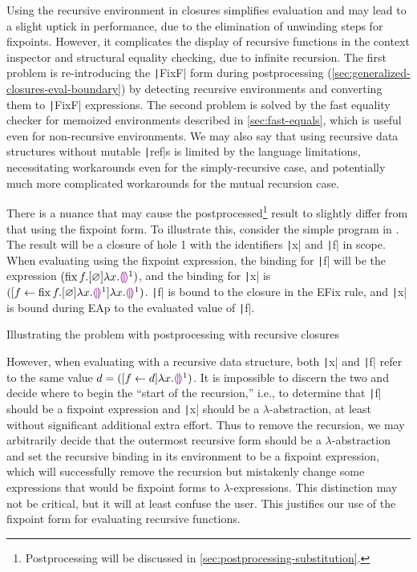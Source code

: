Using the recursive environment in closures simplifies evaluation and may lead to a slight uptick in performance, due to the elimination of unwinding steps for fixpoints. However, it complicates the display of recursive functions in the context inspector and structural equality checking, due to infinite recursion. The first problem is re-introducing the \texttt|FixF| form during postprocessing (\cref{sec:generalized-closures-eval-boundary}) by detecting recursive environments and converting them to \texttt|FixF| expressions. The second problem is solved by the fast equality checker for memoized environments described in \cref{sec:fast-equals}, which is useful even for non-recursive environments. We may also say that using recursive data structures without mutable \texttt|ref|s is limited by the language limitations, necessitating workarounds even for the simply-recursive case, and potentially much more complicated workarounds for the mutual recursion case.

There is a nuance that may cause the postprocessed\footnote{Postprocessing will be discussed in \cref{sec:postprocessing-substitution}.} result to slightly differ from that using the fixpoint form. To illustrate this, consider the simple program in . The result will be a closure of hole 1 with the identifiers \texttt|x| and \texttt|f| in scope. When evaluating using the fixpoint expression, the binding for \texttt|f| will be the expression $(\operatorname{fix} f.[\varnothing]\lambda x.\textcolor{violet}{\llparenthesis}\textcolor{violet}{\rrparenthesis}^1)$, and the binding for \texttt|x| is $([f\leftarrow \operatorname{fix} f.[\varnothing]\lambda x.\textcolor{violet}{\llparenthesis}\textcolor{violet}{\rrparenthesis}^1]\lambda x.\textcolor{violet}{\llparenthesis}\textcolor{violet}{\rrparenthesis}^1)$. \texttt|f| is bound to the closure in the EFix rule, and \texttt|x| is bound during EAp to the evaluated value of \texttt|f|.

\begin{listing}
  \centering
  \caption{Illustrating the problem with postprocessing with recursive closures}
  \label{fig:rec-closures-issue}
\end{listing}

However, when evaluating with a recursive data structure, both \texttt|x| and \texttt|f| refer to the same value $d=([f\leftarrow d]\lambda x.\textcolor{violet}{\llparenthesis}\textcolor{violet}{\rrparenthesis}^1)$. It is impossible to discern the two and decide where to begin the ``start of the recursion,'' i.e., to determine that \texttt|f| should be a fixpoint expression and \texttt|x| should be a $\lambda$-abstraction, at least without significant additional extra effort. Thus to remove the recursion, we may arbitrarily decide that the outermost recursive form should be a $\lambda$-abstraction and set the recursive binding in its environment to be a fixpoint expression, which will successfully remove the recursion but mistakenly change some expressions that would be fixpoint forms to $\lambda$-expressions. This distinction may not be critical, but it will at least confuse the user. This justifies our use of the fixpoint form for evaluating recursive functions.

